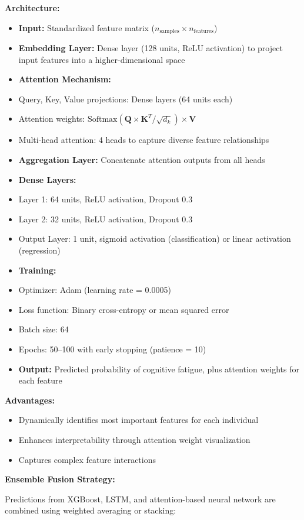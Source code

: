 \documentclass[journal,twoside,10pt]{IEEEtran}
\begin{document}
\textbf{Architecture:}
\begin{itemize}
\item \textbf{Input:} Standardized feature matrix ($n_{\text{samples}} \times n_{\text{features}}$)
\item \textbf{Embedding Layer:} Dense layer (128 units, ReLU activation) to project input features into a higher-dimensional space
\item \textbf{Attention Mechanism:}
\item Query, Key, Value projections: Dense layers (64 units each)
\item Attention weights: $\text{Softmax}(\mathbf{Q} \times \mathbf{K}^T / \sqrt{d_k}) \times \mathbf{V}$
\item Multi-head attention: 4 heads to capture diverse feature relationships
\item \textbf{Aggregation Layer:} Concatenate attention outputs from all heads
\item \textbf{Dense Layers:}
\item Layer 1: 64 units, ReLU activation, Dropout 0.3
\item Layer 2: 32 units, ReLU activation, Dropout 0.3
\item Output Layer: 1 unit, sigmoid activation (classification) or linear activation (regression)
\item \textbf{Training:}
\item Optimizer: Adam (learning rate = 0.0005)
\item Loss function: Binary cross-entropy or mean squared error
\item Batch size: 64
\item Epochs: 50--100 with early stopping (patience = 10)
\item \textbf{Output:} Predicted probability of cognitive fatigue, plus attention weights for each feature
\end{itemize}

\textbf{Advantages:}
\begin{itemize}
\item Dynamically identifies most important features for each individual
\item Enhances interpretability through attention weight visualization
\item Captures complex feature interactions
\end{itemize}

\textbf{Ensemble Fusion Strategy:}

Predictions from XGBoost, LSTM, and attention-based neural network are combined using weighted averaging or stacking:
\end{document}

